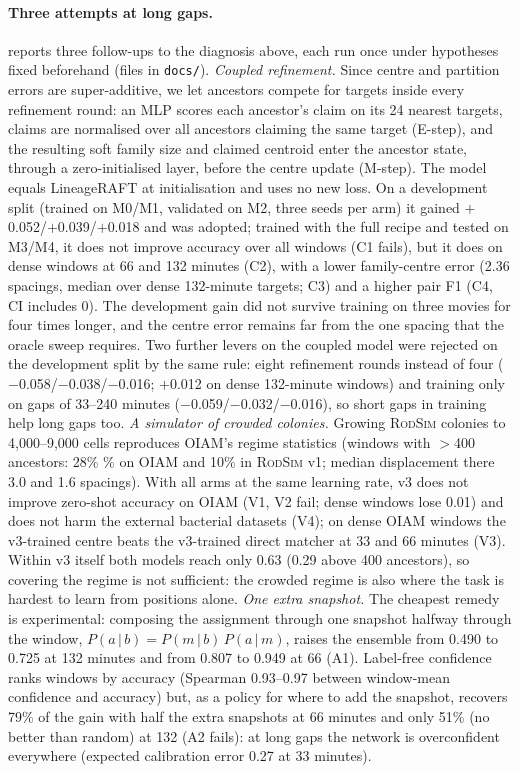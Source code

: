 \documentclass[10pt,twocolumn,letterpaper]{article}
\newcommand{\ours}{LineageRAFT\xspace}
\newcommand{\rodsim}{\textsc{RodSim}\xspace}
\begin{document}
\paragraph{Three attempts at long gaps.}
 reports three follow-ups to the diagnosis above, each run once under hypotheses fixed beforehand (files in \texttt{docs/}).
\emph{Coupled refinement.} Since centre and partition errors are super-additive, we let ancestors compete for targets inside every refinement round: an MLP scores each ancestor's claim on its 24 nearest targets, claims are normalised over all ancestors claiming the same target (E-step), and the resulting soft family size and claimed centroid enter the ancestor state, through a zero-initialised layer, before the centre update (M-step). The model equals \ours at initialisation and uses no new loss. On a development split (trained on M0/M1, validated on M2, three seeds per arm) it gained $+$0.052/$+$0.039/$+$0.018 and was adopted; trained with the full recipe and tested on M3/M4, it does not improve accuracy over all windows (C1 fails), but it does on dense windows at 66 and 132 minutes (C2), with a lower family-centre error (2.36  spacings, median over dense 132-minute targets; C3) and a higher pair F1 (C4, CI includes 0). The development gain did not survive training on three movies for four times longer, and the centre error remains far from the one spacing that the oracle sweep requires. Two further levers on the coupled model were rejected on the development split by the same rule: eight refinement rounds instead of four ($-$0.058/$-$0.038/$-$0.016; $+$0.012 on dense 132-minute windows) and training only on gaps of 33--240 minutes ($-$0.059/$-$0.032/$-$0.016), so short gaps in training help long gaps too.
\emph{A simulator of crowded colonies.} Growing \rodsim colonies to 4{,}000--9{,}000 cells reproduces OIAM's regime statistics (windows with $>$400 ancestors: 28\% \% on OIAM and 10\% in \rodsim v1; median displacement there 3.0  and 1.6 spacings). With all arms at the same learning rate, v3 does not improve zero-shot accuracy on OIAM (V1, V2 fail; dense windows lose 0.01) and does not harm the external bacterial datasets (V4); on dense OIAM windows the v3-trained centre beats the v3-trained direct matcher at 33 and 66 minutes (V3). Within v3 itself both models reach only 0.63 (0.29 above 400 ancestors), so covering the regime is not sufficient: the crowded regime is also where the task is hardest to learn from positions alone.
\emph{One extra snapshot.} The cheapest remedy is experimental: composing the assignment through one snapshot halfway through the window, $P(a\,|\,b)=P(m\,|\,b)\,P(a\,|\,m)$, raises the ensemble from 0.490 to 0.725 at 132 minutes and from 0.807 to 0.949 at 66 (A1). Label-free confidence ranks windows by accuracy (Spearman 0.93--0.97 between window-mean confidence and accuracy) but, as a policy for where to add the snapshot, recovers 79\% of the gain with half the extra snapshots at 66 minutes and only 51\% (no better than random) at 132 (A2 fails): at long gaps the network is overconfident everywhere (expected calibration error 0.27  at 33 minutes).


{
    \small
    
    
}
\end{document}

